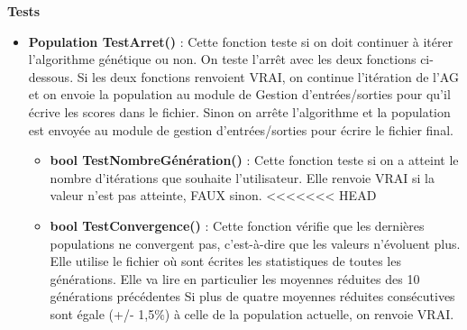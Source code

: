 \documentclass[a4paper,11pt]{article}
\begin{document}
			\textbf{Tests}
				\begin{itemize}
							\item \textbf{Population TestArret()} :  Cette fonction teste si on doit continuer à itérer l’algorithme génétique ou non. 
								On teste l’arrêt avec les deux fonctions ci-dessous. 
								Si les deux fonctions renvoient VRAI, on continue l’itération de l’AG et on envoie la population au module de Gestion d’entrées/sorties pour qu’il écrive les scores dans le fichier. 
								Sinon on arrête l'algorithme et la population est envoyée au module de gestion d’entrées/sorties pour écrire le fichier final.\vspace{0.2cm}
								\begin{itemize}
								\item \textbf{bool TestNombreGénération()} : Cette fonction teste si on a atteint le nombre d’itérations que souhaite l’utilisateur.
									Elle renvoie VRAI si la valeur n’est pas atteinte, FAUX sinon.\vspace{0.2cm}
<<<<<<< HEAD
								\item \textbf{bool TestConvergence()} : Cette fonction vérifie que les dernières populations ne convergent pas, c'est-à-dire que les valeurs n'évoluent plus. %
								Elle utilise le fichier où sont écrites les statistiques de toutes les générations. Elle va lire en particulier les moyennes réduites des 10 générations précédentes
															Si plus de quatre moyennes réduites consécutives sont égale (+/- 1,5$\%$) à celle de la population actuelle, on renvoie VRAI.


\end{itemize}
\end{itemize}
\end{document}
